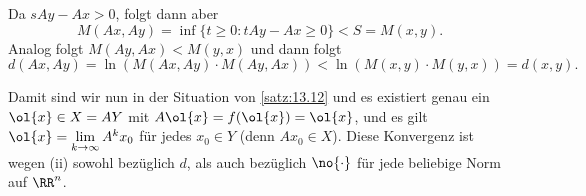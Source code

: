 \begin{beweis}
\begin{enumerate}[(i)]
		Da $sAy-Ax > 0$, folgt dann aber
		\[
			M(Ax,Ay) = \inf\{t \geq 0 : tAy-Ax \geq 0\} < S = M(x,y).
		\]
		Analog folgt $M(Ay,Ax) < M(y,x)$ und dann folgt
		\[
			d(Ax,Ay) = \ln(M(Ax,Ay) \cdot M(Ay,Ax)) < \ln(M(x,y) \cdot M(y,x)) = d(x,y).
		\]
	
		Damit sind wir nun in der Situation von \autoref{satz:13.12} und es existiert genau ein $\ol{x} \in X = AY$ mit $A\ol{x} = f(\ol{x}) = \ol{x}$, und es gilt $\ol{x} = \lim\limits_{k\rightarrow \infty} A^k x_0$ für jedes $x_0 \in Y$ (denn $Ax_0 \in X$).
		Diese Konvergenz ist wegen (ii) sowohl bezüglich $d$, als auch bezüglich $\no{\cdot}$ für jede beliebige Norm auf $\RR^n$. \qedhere
	\end{enumerate}
\end{beweis}